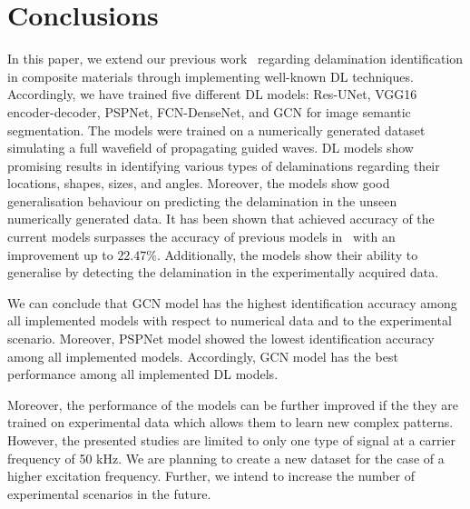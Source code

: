 \section{Conclusions}
\label{conclusion}
In this paper, we extend our previous work~\cite{Ijjeh2021} regarding delamination identification in composite materials through implementing well-known DL techniques. 
Accordingly, we have trained five different DL models: Res-UNet, VGG16 encoder-decoder, PSPNet, FCN-DenseNet, and GCN for image semantic segmentation.
The models were trained on a numerically generated dataset simulating a full wavefield of propagating guided waves.
DL models show promising results in identifying various types of delaminations regarding their locations, shapes, sizes, and angles. 
Moreover, the models show good generalisation behaviour on predicting the delamination in the unseen numerically generated data.
It has been shown that achieved accuracy of the current models surpasses the accuracy of previous models in~\cite{Ijjeh2021} with an improvement up to \(22.47\%\).
Additionally, the models show their ability to generalise by detecting the delamination in the experimentally acquired data.

We can conclude that GCN model has the highest identification accuracy among all implemented models with respect to numerical data and to the experimental scenario.
Moreover, PSPNet model showed the lowest identification accuracy among all implemented models.
Accordingly, GCN model has the best performance among all implemented DL models.
 
Moreover, the performance of the models can be further improved if the they are trained on experimental data which allows them to learn new complex patterns.
However, the presented studies are limited to only one type of signal at a carrier frequency of 50 kHz. 
We are planning to create a new dataset for the case of a higher excitation frequency. 
Further, we intend to increase the number of experimental scenarios in the future.